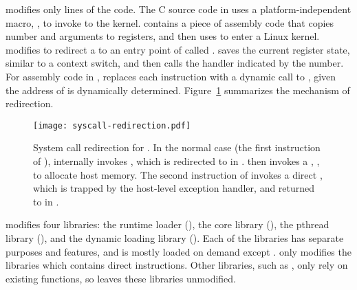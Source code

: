 \graphene{} modifies only \gipclines{} lines of the \glibc{} code.
The C source code in \glibc{} uses a platform-independent macro,
,
to invoke \linuxapis{} to the kernel.
 contains a piece of assembly code
that copies \linuxapi{} number and arguments to registers,
and then uses  to enter a Linux kernel.
\graphene{} modifies 
to redirect a \linuxapi{} to
an entry point of \thelibos{} called .
 saves the current register state, similar to a context switch,
and then
calls the \linuxapi{} handler
indicated by the \linuxapi{} number.
For assembly code in \glibc{},
\graphene{} replaces each  instruction with
a dynamic call to
, given the address of  is dynamically determined.
Figure~\ref{fig:libos:syscall-redirection} summarizes the mechanism of \linuxapi{} redirection.


\begin{figure}[t!]
\centering
\texttt{[image: syscall-redirection.pdf]}
\footnotesize
\caption{System call redirection for \thelibos{}.
In the normal case (the first instruction of ),  internally invokes 
, which is redirected to  in \thelibos{}.\thelibos{} then invokes a \hostapi{}, , to allocate host memory. The second instruction of  invokes a direct \linuxapi{}, which is trapped by the host-level exception handler,
and returned to  in \thelibos{}.}
\label{fig:libos:syscall-redirection}
\end{figure}


\graphene{} modifies four \glibc{} libraries:
the runtime loader (), the core library (), the pthread library (\libpthread{}), and the dynamic loading library (\libdl{}).
Each of the \Glibc{} libraries has separate purposes and features,
and is mostly loaded on demand except .
\graphene{} only modifies the \glibc{} libraries which contains direct  instructions.
Other libraries, such as ,
only rely on 
existing \libc{} functions,
so \graphene{} leaves these libraries unmodified.



